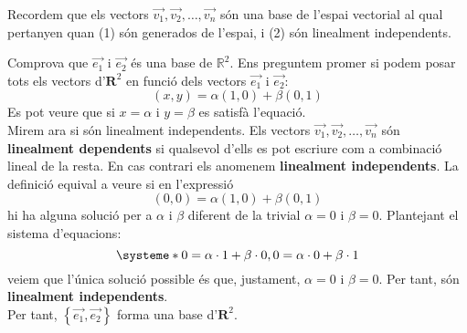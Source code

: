 \Answer  Recordem que els vectors $\overrightarrow{v_1},\overrightarrow{v_2}, \ldots, \overrightarrow{v_n}$ són una base de l'espai vectorial al qual pertanyen quan (1) són generados de l'espai, i (2) són linealment independents.
\begin{llista}
\item Comprova que $\overrightarrow{e_1}$ i $\overrightarrow{e_2}$ és una base de $\mathbb{R}^2$. Ens preguntem promer si podem posar tots els vectors d'$\mathbf{R}^2$ en funció dels vectors $\overrightarrow{e_1}$ i $\overrightarrow{e_2}$:
\[(x,y) = \alpha (1,0) + \beta (0,1) \]
Es pot veure que si $x=\alpha$ i $y=\beta$ es satisfà l'equació.\\
Mirem ara si són linealment independents. Els vectors $\overrightarrow{v_1},\overrightarrow{v_2}, \ldots, \overrightarrow{v_n}$ són {\bf linealment dependents} si qualsevol d'ells es pot escriure com a combinació lineal de la resta. En cas contrari els anomenem {\bf linealment independents}. La definició equival a veure si en l'expressió
\[(0,0) = \alpha (1,0) + \beta (0,1) \]
hi ha alguna solució per a $\alpha$ i $\beta$ diferent de la trivial $\alpha=0$ i $\beta=0$.
Plantejant el sistema d'equacions:
\[
  \systeme*{0=\alpha\cdot 1 + \beta\cdot 0, 0=\alpha\cdot 0 + \beta\cdot 1}
\]
veiem que l'única solució possible és que, justament, $\alpha=0$ i $\beta=0$. Per tant, són {\bf linealment independents}.\\
Per tant, $\left\{\overrightarrow{e_1},\overrightarrow{e_2}\right\}$ forma una base d'$\mathbf{R}^2$.



\end{llista}

